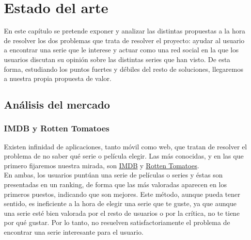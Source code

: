 \chapter{Estado del arte}

En este capítulo se pretende exponer y analizar las distintas propuestas a la hora de resolver los dos problemas que
trata de resolver el proyecto: ayudar al usuario a encontrar una serie que le interese y actuar como una red social en
la que los usuarios discutan su opinión sobre las distintas series que han visto. De esta forma, estudiando los puntos
fuertes y débiles del resto de soluciones, llegaremos a nuestra propia propuesta de valor.\\

\section{Análisis del mercado}
\subsection{IMDB y Rotten Tomatoes}

Existen infinidad de aplicaciones, tanto móvil como web, que tratan de resolver el problema de no saber qué serie o
película elegir. Las más conocidas, y en las que primero fijaremos nuestra mirada, son \href{https://www.imdb.com}
{IMDB} y \href{https://www.rottentomatoes.com}{Rotten Tomatoes}.\\

En ambas, los usuarios puntúan una serie de películas o series y éstas son presentadas en un ranking, de forma que
las más valoradas aparecen en los primeros puestos, indicando que son mejores. Este método, aunque pueda tener
sentido, es ineficiente a la hora de elegir una serie que te guste, ya que aunque una serie esté bien valorada por
el resto de usuarios o por la crítica, no te tiene por qué gustar. Por lo tanto, no resuelven satisfactoriamente
el problema de encontrar una serie interesante para el usuario.\\

